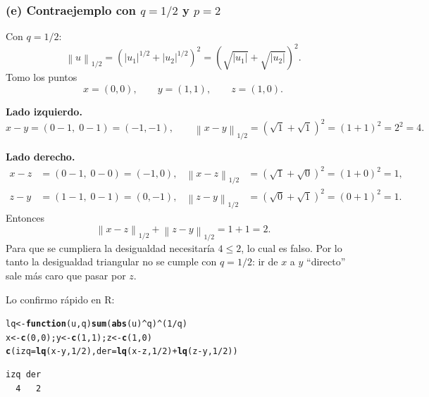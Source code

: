 \documentclass[11pt]{article}\usepackage[]{graphicx}\usepackage[]{xcolor}
\makeatletter
\newcommand{\hlnum}[1]{\textcolor[rgb]{0.686,0.059,0.569}{#1}}%
\newcommand{\hlopt}[1]{\textcolor[rgb]{0,0,0}{#1}}%
\newcommand{\hldef}[1]{\textcolor[rgb]{0.345,0.345,0.345}{#1}}%
\newcommand{\hlkwa}[1]{\textcolor[rgb]{0.161,0.373,0.58}{\textbf{#1}}}%
\newcommand{\hlkwb}[1]{\textcolor[rgb]{0.69,0.353,0.396}{#1}}%
\newcommand{\hlkwc}[1]{\textcolor[rgb]{0.333,0.667,0.333}{#1}}%
\newcommand{\hlkwd}[1]{\textcolor[rgb]{0.737,0.353,0.396}{\textbf{#1}}}%
\newenvironment{kframe}{%
 \def\at@end@of@kframe{}%
 \ifinner\ifhmode%
  \def\at@end@of@kframe{\end{minipage}}%
  \begin{minipage}{\columnwidth}%
 \fi\fi%
 \def\FrameCommand##1{\hskip\@totalleftmargin \hskip-\fboxsep
 \colorbox{shadecolor}{##1}\hskip-\fboxsep
     \hskip-\linewidth \hskip-\@totalleftmargin \hskip\columnwidth}%
 \MakeFramed {\advance\hsize-\width
   \@totalleftmargin\z@ \linewidth\hsize
   \@setminipage}}%
 {\par\unskip\endMakeFramed%
 \at@end@of@kframe}
\newenvironment{knitrout}{}{} %
\newcommand{\norm}[1]{\left\lVert #1 \right\rVert}
\makeatother
\begin{document}
\subsubsection*{(e) Contraejemplo con $q = 1/2$ y $p = 2$}

Con $q = 1/2$:
\[
\norm{u}_{1/2} = \left(|u_1|^{1/2} + |u_2|^{1/2}\right)^{2} = \left(\sqrt{|u_1|} + \sqrt{|u_2|}\right)^{2}.
\]
Tomo los puntos
\[
x = (0,0), \qquad y = (1,1), \qquad z = (1,0).
\]

\textbf{Lado izquierdo.}
\[
x - y = (0-1,\;0-1) = (-1,-1),\qquad
\norm{x-y}_{1/2} = \left(\sqrt{1} + \sqrt{1}\right)^2 = (1+1)^2 = 2^2 = 4.
\]

\textbf{Lado derecho.}
\begin{align*}
x - z &= (0-1,\;0-0) = (-1,0), & \norm{x-z}_{1/2} &= \left(\sqrt{1} + \sqrt{0}\right)^2 = (1+0)^2 = 1,\\
z - y &= (1-1,\;0-1) = (0,-1), & \norm{z-y}_{1/2} &= \left(\sqrt{0} + \sqrt{1}\right)^2 = (0+1)^2 = 1.
\end{align*}
Entonces
\[
\norm{x-z}_{1/2} + \norm{z-y}_{1/2} = 1 + 1 = 2 .
\]
Para que se cumpliera la desigualdad necesitaría $4 \le 2$, lo cual es falso. Por lo tanto la desigualdad triangular no se cumple con $q=1/2$: ir de $x$ a $y$ ``directo'' sale más caro que pasar por $z$.

Lo confirmo rápido en R:

\begin{knitrout}\small
{}\color{fgcolor}\begin{kframe}
\begin{alltt}
\hldef{lq} \hlkwb{<-} \hlkwa{function}\hldef{(}\hlkwc{u}\hldef{,} \hlkwc{q}\hldef{)} \hlkwd{sum}\hldef{(}\hlkwd{abs}\hldef{(u)}\hlopt{^}\hldef{q)}\hlopt{^}\hldef{(}\hlnum{1}\hlopt{/}\hldef{q)}
\hldef{x} \hlkwb{<-} \hlkwd{c}\hldef{(}\hlnum{0}\hldef{,} \hlnum{0}\hldef{); y} \hlkwb{<-} \hlkwd{c}\hldef{(}\hlnum{1}\hldef{,} \hlnum{1}\hldef{); z} \hlkwb{<-} \hlkwd{c}\hldef{(}\hlnum{1}\hldef{,} \hlnum{0}\hldef{)}
\hlkwd{c}\hldef{(}\hlkwc{izq} \hldef{=} \hlkwd{lq}\hldef{(x} \hlopt{-} \hldef{y,} \hlnum{1}\hlopt{/}\hlnum{2}\hldef{),} \hlkwc{der} \hldef{=} \hlkwd{lq}\hldef{(x} \hlopt{-} \hldef{z,} \hlnum{1}\hlopt{/}\hlnum{2}\hldef{)} \hlopt{+} \hlkwd{lq}\hldef{(z} \hlopt{-} \hldef{y,} \hlnum{1}\hlopt{/}\hlnum{2}\hldef{))}
\end{alltt}
\begin{verbatim}
izq der 
  4   2 
\end{verbatim}
\end{kframe}
\end{knitrout}
\end{document}
